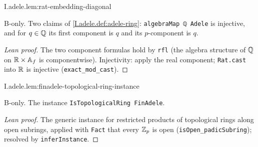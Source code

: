 \begin{lemma}
\bonly
{}
\end{lemma}
\begin{tfformal}{I.adele.lem:rat-embedding-diagonal}
\begin{tffidelity}
B-only. Two claims of \cref{I.adele.def:adele-ring}: \texttt{algebraMap ℚ Adele} is injective, and for $q\in\mathbb{Q}$ its first component is $q$ and its $p$-component is $q$.
\end{tffidelity}
\end{tfformal}
\begin{proof}[Lean proof]
The two component formulas hold by \texttt{rfl} (the algebra structure of $\mathbb{Q}$ on $\mathbb{R}\times\mathbb{A}_f$ is componentwise). Injectivity: apply the real component; \texttt{Rat.cast} into $\mathbb{R}$ is injective (\texttt{exact\_mod\_cast}).
\end{proof}

\begin{lemma}
\bonly
{}
\end{lemma}
\begin{tfformal}{I.adele.lem:finadele-topological-ring-instance}
\begin{tffidelity}
B-only. The instance \texttt{IsTopologicalRing FinAdele}.
\end{tffidelity}
\end{tfformal}
\begin{proof}[Lean proof]
The generic instance for restricted products of topological rings along open subrings, applied with \texttt{Fact} that every $\mathbb{Z}_p$ is open (\texttt{isOpen\_padicSubring}); resolved by \texttt{inferInstance}.
\end{proof}

